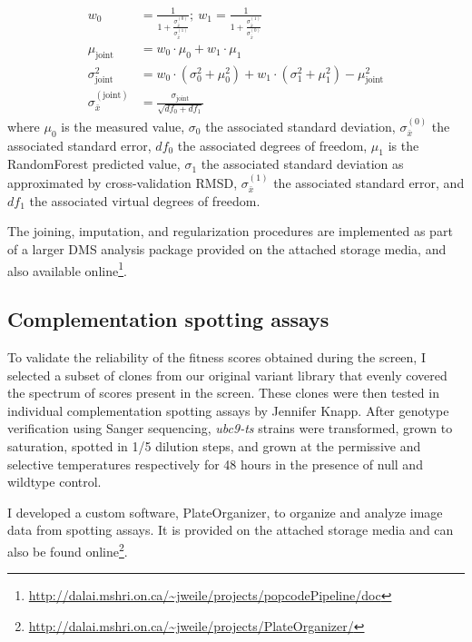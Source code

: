 \begin{align*}
w_0 &= \frac{1}{1+\frac{\sigma_{\bar x}^{(0)}}{\sigma_{\bar x}^{(1)}}}; ~ w_1 = \frac{1}{1+\frac{\sigma_{\bar x}^{(1)}}{\sigma_{\bar x}^{(0)}}}\\
\mu_\text{joint} &= w_0 \cdot \mu_0 + w_1 \cdot \mu_1\\
\sigma_\text{joint}^2 &= w_0 \cdot (\sigma_0^2 + \mu_0^2) + w_1 \cdot (\sigma_1^2 + \mu_1^2) - \mu_\text{joint}^2\\
\sigma_{\bar x}^{(\text{joint})} &= \frac{\sigma_\text{joint}}{\sqrt{df_0 + df_1}}
\end{align*}
where $\mu_0$ is the measured value, $\sigma_0$ the associated standard deviation, $\sigma_{\bar x}^{(0)}$ the associated standard error, $df_0$ the associated degrees of freedom, $\mu_1$ is the RandomForest predicted value, $\sigma_1$ the associated standard deviation as approximated by cross-validation RMSD, $\sigma_{\bar x}^{(1)}$ the associated standard error, and $df_1$ the associated virtual degrees of freedom.

The joining, imputation, and regularization procedures are implemented as part of a larger DMS analysis package provided on the attached storage media, and also available online\footnote{\url{http://dalai.mshri.on.ca/~jweile/projects/popcodePipeline/doc}}.

\subsection{Complementation spotting assays}
To validate the reliability of the fitness scores obtained during the screen, I selected a subset of clones from our original variant library that evenly covered the spectrum of scores present in the screen. These clones were then tested in individual complementation spotting assays by Jennifer Knapp. After genotype verification using Sanger sequencing,  \textit{ubc9-ts} strains were transformed, grown to saturation, spotted in 1/5 dilution steps, and grown at the permissive and selective temperatures respectively for 48 hours in the presence of null and wildtype control. 

I developed a custom software, PlateOrganizer, to organize and analyze image data from spotting assays. It is provided on the attached storage media and can also be found online\footnote{\url{http://dalai.mshri.on.ca/~jweile/projects/PlateOrganizer/}}.

